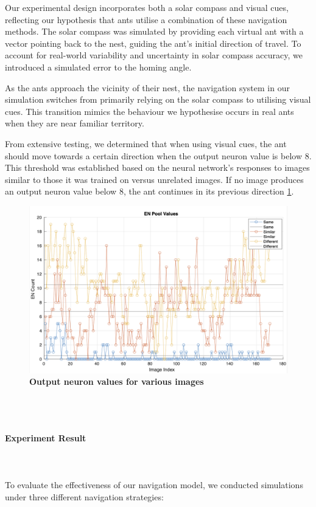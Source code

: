 \documentclass[12pt,a4paper]{article}
\begin{document}
Our experimental design incorporates both a solar compass and visual cues, reflecting our hypothesis that ants utilise a combination of these navigation methods. The solar compass was simulated by providing each virtual ant with a vector pointing back to the nest, guiding the ant’s initial direction of travel. To account for real-world variability and uncertainty in solar compass accuracy, we introduced a simulated error to the homing angle.

As the ants approach the vicinity of their nest, the navigation system in our simulation switches from primarily relying on the solar compass to utilising visual cues. This transition mimics the behaviour we hypothesise occurs in real ants when they are near familiar territory.

From extensive testing, we determined that when using visual cues, the ant should move towards a certain direction when the output neuron value is below 8. This threshold was established based on the neural network’s responses to images similar to those it was trained on versus unrelated images. If no image produces an output neuron value below 8, the ant continues in its previous direction \ref{en_output}.

\begin{figure}[H]
    \centering
    \captionsetup{justification=centering, margin=2cm}
    \includegraphics[width=1\linewidth]{enoutput.png}
    \caption{\textbf{Output neuron values for various images}}
    \label{en_output}
\end{figure}

\\~\\
\paragraph{Experiment Result}\\~\\
To evaluate the effectiveness of our navigation model, we conducted simulations under three different navigation strategies:
\end{document}
